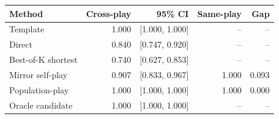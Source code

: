 \begin{tabular}{lrrrr}
\toprule
Method & Cross-play & 95\% CI & Same-play & Gap \\
\midrule
Template & 1.000 & [1.000, 1.000] & -- & -- \\
Direct & 0.840 & [0.747, 0.920] & -- & -- \\
Best-of-K shortest & 0.740 & [0.627, 0.853] & -- & -- \\
Mirror self-play & 0.907 & [0.833, 0.967] & 1.000 & 0.093 \\
Population-play & 1.000 & [1.000, 1.000] & 1.000 & 0.000 \\
Oracle candidate & 1.000 & [1.000, 1.000] & -- & -- \\
\bottomrule
\end{tabular}
